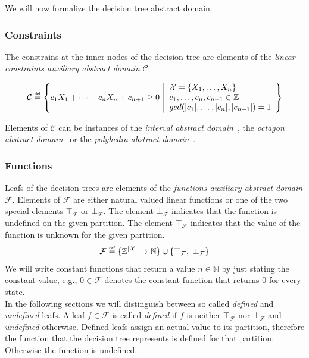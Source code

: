 \documentclass[11pt,a4paper,titlepage]{article}
\theoremstyle{definition}
\newcommand\eqdef{\mathrel{\overset{\makebox[0pt]{\mbox{\normalfont\tiny\sffamily def}}}{=}}}
\begin{document}
We will now formalize the decision tree abstract domain.

\subsubsection*{Constraints}

The constrains at the inner nodes of the decision tree are elements of the 
\textit{linear constraints auxiliary abstract domain} $\mathcal{C}$.  

\[
    \mathcal{C} \eqdef 
    \left
        \{ 
        c_1 X_1 + \dots + c_n X_n + c_{n+1} \geq 0 \
        \middle\vert 
        \begin{array}{l}
            \mathcal{X} = \{X_1, \dots, X_n\}\\
            c_1, \dots, c_n, c_{n+1} \in \mathbb{Z} \\
            gcd(|c_1|, \dots, |c_n|, |c_{n+1}|) = 1
        \end{array}
    \right
    \}
\]

Elements of $\mathcal{C}$ can be instances of the \textit{interval abstract domain}~\cite{CousotCousot76-1}, 
the \textit{octagon abstract domain}~\cite{Mine:2006:OAD:1145489.1145526} or the \textit{polyhedra abstract domain}~\cite{Cousot:1978:ADL:512760.512770}.

\subsubsection*{Functions}

Leafs of the decision trees are elements of the \textit{functions auxiliary abstract domain} $\mathcal{F}$.
Elements of $\mathcal{F}$ are either natural valued linear functions or one of the two special elements $\top_{\mathcal{F}}$ or $\bot_{\mathcal{F}}$.
The element $\bot_{\mathcal{F}}$ indicates that the function is undefined on the given partition. 
The element $\top_{\mathcal{F}}$ indicates that the value of the function is unknown for the given partition.
\[
    \mathcal{F} \eqdef \{ \mathbb{Z}^{|\mathcal{X}|} \rightarrow \mathbb{N} \} \cup \{ \top_{\mathcal{F}}, \ \bot_{\mathcal{F}} \}
\]
We will write constant functions that return a value $n \in \mathbb{N}$ by just stating the constant value, e.g., $0 \in \mathcal{F}$ 
denotes the constant function that returns $0$ for every state.\\

In the following sections we will distinguish between so called \textit{defined} and \textit{undefined} leafs. 
A leaf $f \in \mathcal{F}$ is called \textit{defined} if $f$ is neither $\top_{\mathcal{F}}$ nor $\bot_{\mathcal{F}}$  and \textit{undefined} otherwise.
Defined leafs assign an actual value to its partition, therefore the function that the decision tree represents is defined for that partition. Otherwise 
the function is undefined.
\end{document}
